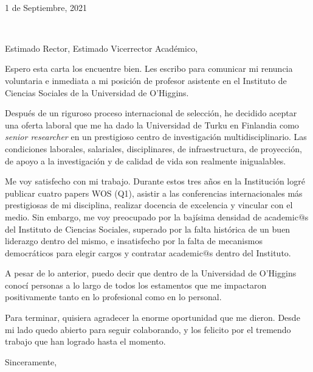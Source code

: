 \documentclass[11pt, a4paper]{letter} %
\renewcommand{\opening}[1]{
	{\centering\fromaddress\vspace{0.05\textheight} \\ %
	1 de Septiembre, 2021\hspace*{\fill}\par} %
	{\raggedright \toname \\ \toaddress \par} %
	\vspace{1cm} %
	\noindent #1 %
}
\renewcommand{\closing}[1]{
	\vspace{2.5mm} %
	\noindent %
	\hspace*{\longindentation} %
	\parbox{\indentedwidth}{
		\raggedright
		#1 %
		\vskip 1.65cm %
		\fromsig %
	}
}
\begin{document}

\begin{letter}{
}


\opening{Estimado Rector, Estimado Vicerrector Acad\'emico,}

Espero esta carta los encuentre bien. Les escribo para comunicar mi renuncia voluntaria e inmediata a mi posici\'on de profesor asistente en el Instituto de Ciencias Sociales de la Universidad de O'Higgins.

Despu\'es de un riguroso proceso internacional de selecci\'on, he decidido aceptar una oferta laboral que me ha dado la Universidad de Turku en Finlandia como \emph{senior researcher} en un prestigioso centro de investigaci\'on multidisciplinario. Las condiciones laborales, salariales, disciplinares, de infraestructura, de proyecci\'on, de apoyo a la investigaci\'on y de calidad de vida son realmente inigualables. 

Me voy satisfecho con mi trabajo. Durante estos tres a\~nos en la Instituci\'on logr\'e publicar cuatro papers WOS (Q1), asistir a las conferencias internacionales m\'as prestigiosas de mi disciplina, realizar docencia de excelencia y vincular con el medio. Sin embargo, me voy preocupado por la baj\'isima densidad de academic$@$s del Instituto de Ciencias Sociales, superado por la falta hist\'orica de un buen liderazgo dentro del mismo, e insatisfecho por la falta de mecanismos democr\'aticos para elegir cargos y contratar academic$@$s dentro del Instituto.

A pesar de lo anterior, puedo decir que dentro de la Universidad de O'Higgins conoc\'i personas a lo largo de todos los estamentos que me impactaron positivamente tanto en lo profesional como en lo personal. 

Para terminar, quisiera agradecer la enorme oportunidad que me dieron. Desde mi lado quedo abierto para seguir colaborando, y los felicito por el tremendo trabajo que han logrado hasta el momento.

\closing{Sinceramente,}




\end{letter}
\end{document}
